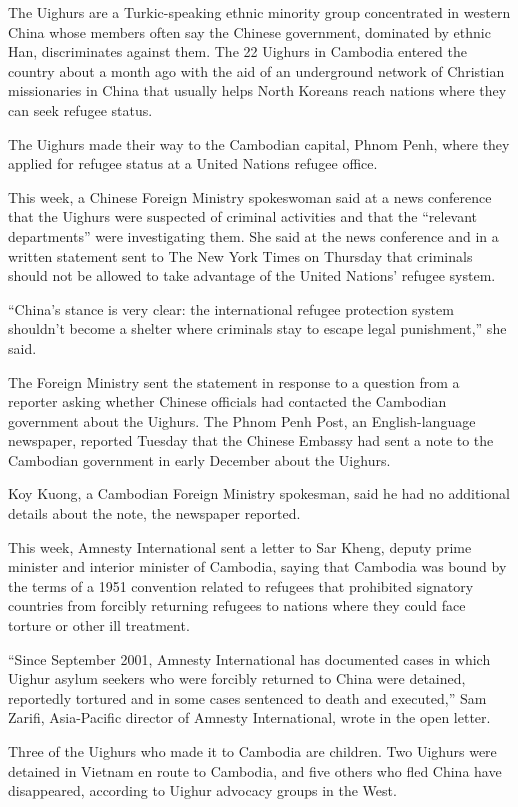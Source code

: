 ﻿\documentclass[12pt]{article}
\begin{document}
The Uighurs are a Turkic-speaking ethnic minority group concentrated in western China whose members
often say the Chinese government, dominated by ethnic Han, discriminates against them. The 22
Uighurs in Cambodia entered the country about a month ago with the aid of an underground network of
Christian missionaries in China that usually helps North Koreans reach nations where they can seek
refugee status.

The Uighurs made their way to the Cambodian capital, Phnom Penh, where they applied for refugee
status at a United Nations refugee office.

This week, a Chinese Foreign Ministry spokeswoman said at a news conference that the Uighurs were
suspected of criminal activities and that the ``relevant departments'' were investigating them. She
said at the news conference and in a written statement sent to The New York Times on Thursday that
criminals should not be allowed to take advantage of the United Nations' refugee system.

``China's stance is very clear: the international refugee protection system shouldn't become a
shelter where criminals stay to escape legal punishment,'' she said.

The Foreign Ministry sent the statement in response to a question from a reporter asking whether
Chinese officials had contacted the Cambodian government about the Uighurs. The Phnom Penh Post, an
English-language newspaper, reported Tuesday that the Chinese Embassy had sent a note to the
Cambodian government in early December about the Uighurs.

Koy Kuong, a Cambodian Foreign Ministry spokesman, said he had no additional details about the note,
the newspaper reported.

This week, Amnesty International sent a letter to Sar Kheng, deputy prime minister and interior
minister of Cambodia, saying that Cambodia was bound by the terms of a 1951 convention related to
refugees that prohibited signatory countries from forcibly returning refugees to nations where they
could face torture or other ill treatment.

``Since September 2001, Amnesty International has documented cases in which Uighur asylum seekers
who were forcibly returned to China were detained, reportedly tortured and in some cases sentenced
to death and executed,'' Sam Zarifi, Asia-Pacific director of Amnesty International, wrote in the
open letter.

Three of the Uighurs who made it to Cambodia are children. Two Uighurs were detained in Vietnam en
route to Cambodia, and five others who fled China have disappeared, according to Uighur advocacy
groups in the West.
\end{document}
